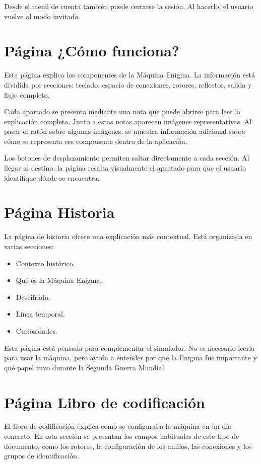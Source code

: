 Desde el menú de cuenta también puede cerrarse la sesión. Al hacerlo, el usuario vuelve al modo invitado.

\section{Página ¿Cómo funciona?}

Esta página explica los componentes de la Máquina Enigma. La información está dividida por secciones: teclado, espacio de conexiones, rotores, reflector, salida y flujo completo.

Cada apartado se presenta mediante una nota que puede abrirse para leer la explicación completa. Junto a estas notas aparecen imágenes representativas. Al pasar el ratón sobre algunas imágenes, se muestra información adicional sobre cómo se representa ese componente dentro de la aplicación.

Los botones de desplazamiento permiten saltar directamente a cada sección. Al llegar al destino, la página resalta visualmente el apartado para que el usuario identifique dónde se encuentra.

\section{Página Historia}

La página de historia ofrece una explicación más contextual. Está organizada en varias secciones:

\begin{itemize}
	\item Contexto histórico.
	\item Qué es la Máquina Enigma.
	\item Descifrado.
	\item Línea temporal.
	\item Curiosidades.
\end{itemize}

Esta página está pensada para complementar el simulador. No es necesario leerla para usar la máquina, pero ayuda a entender por qué la Enigma fue importante y qué papel tuvo durante la Segunda Guerra Mundial.

\section{Página Libro de codificación}

El libro de codificación explica cómo se configuraba la máquina en un día concreto. En esta sección se presentan los campos habituales de este tipo de documento, como los rotores, la configuración de los anillos, las conexiones y los grupos de identificación.

